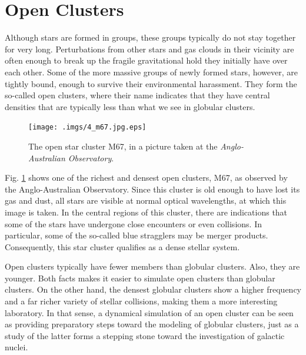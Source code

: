 \documentclass{book}
\begin{document}
\section{  Open Clusters}
\label{sect:9}

Although stars are formed in groups, these groups typically do not
stay together for very long.  Perturbations from other stars and gas
clouds in their vicinity are often enough to break up the fragile
gravitational hold they initially have over each other.  Some of the
more massive groups of newly formed stars, however, are tightly bound,
enough to survive their environmental harassment.  They form the
so-called open clusters, where their name indicates that they have
central densities that are typically less than what we see in globular
clusters.


 
\begin{figure}
\begin{minipage}{\columnwidth}
\begin{center}
\renewcommand{\thefootnote}{\fnsymbol{footnote}}
    \texttt{[image: .imgs/4\_m67.jpg.eps]}
\caption{The open star cluster M67, in a picture taken at the 
 {\it Anglo-Australian Observatory\protect \footnotemark[1]}.
}

\label{m67}
\end{center}
\end{minipage}
\end{figure}



Fig. \ref{m67} shows one of the richest and densest open clusters, M67,
as observed by the Anglo-Australian Observatory.  Since this cluster
is old enough to have lost its gas and dust, all stars are visible at
normal optical wavelengths, at which this image is taken.  In the
central regions of this cluster, there are indications that some of
the stars have undergone close encounters or even collisions.  In
particular, some of the so-called blue stragglers may be merger
products.  Consequently, this star cluster qualifies as a dense
stellar system.

Open clusters typically have fewer members than globular clusters.
Also, they are younger.  Both facts makes it easier to simulate open
clusters than globular clusters.  On the other hand, the densest
globular clusters show a higher frequency and a far richer variety of
stellar collisions, making them a more interesting laboratory.  In
that sense, a dynamical simulation of an open cluster can be seen as
providing preparatory steps toward the modeling of globular clusters,
just as a study of the latter forms a stepping stone toward the
investigation of galactic nuclei.
\end{document}
